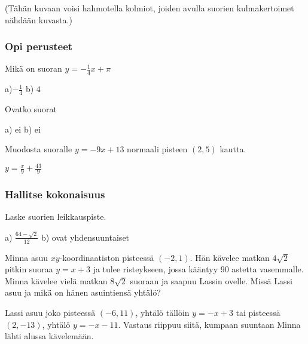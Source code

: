(Tähän kuvaan voisi hahmotella kolmiot, joiden avulla suorien kulmakertoimet nähdään kuvasta.)



\begin{tehtavasivu}

\subsubsection*{Opi perusteet}

\begin {tehtava}
Mikä on suoran $y=-\frac{1}{4}x+\pi$
\begin {vastaus}
a)$-\frac{1}{4}$  b) $4$ 
\end {vastaus}
\end {tehtava}

\begin {tehtava}
Ovatko suorat 
\begin {vastaus}
a) ei b) ei
\end {vastaus}
\end {tehtava}

\begin {tehtava}
Muodosta suoralle $y=-9x+13$ normaali pisteen $(2, 5)$ kautta.
\begin {vastaus}
$y=\frac{x}{9}+\frac{43}{9}$
\end {vastaus}
\end {tehtava}

\subsubsection*{Hallitse kokonaisuus}

\begin {tehtava}
Laske suorien leikkauspiste.
\begin {vastaus}
a) $\frac{64-\sqrt{2}}{12}$ b) ovat yhdensuuntaiset
\end {vastaus}
\end {tehtava}

\begin {tehtava}
Minna asuu $xy$-koordinaatiston pisteessä $(-2, 1)$. Hän kävelee matkan $4\sqrt{2}$ pitkin suoraa $y=x+3$ ja tulee risteykseen, jossa kääntyy $90$ astetta vasemmalle. Minna kävelee vielä matkan $8\sqrt{2}$ suoraan ja saapuu Lassin ovelle. Missä Lassi asuu ja mikä on hänen asuintiensä yhtälö?
\begin {vastaus}
Lassi asuu joko pisteessä $(-6, 11)$, yhtälö tällöin $y=-x+3$ tai pisteessä $(2, -13)$, yhtälö $y=-x-11$. Vastaus riippuu siitä, kumpaan suuntaan Minna lähti alussa kävelemään.
\end {vastaus}
\end {tehtava}


\end{tehtavasivu}
